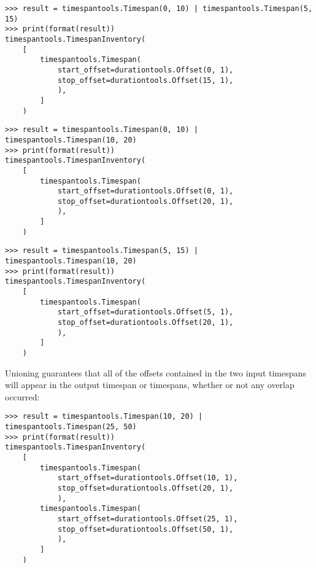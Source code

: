 \begin{abjadbookoutput}
\begin{singlespacing}
\vspace{-0.5\baselineskip}
\begin{verbatim}
>>> result = timespantools.Timespan(0, 10) | timespantools.Timespan(5, 15)
>>> print(format(result))
timespantools.TimespanInventory(
    [
        timespantools.Timespan(
            start_offset=durationtools.Offset(0, 1),
            stop_offset=durationtools.Offset(15, 1),
            ),
        ]
    )
\end{verbatim}
\begin{verbatim}
>>> result = timespantools.Timespan(0, 10) | timespantools.Timespan(10, 20)
>>> print(format(result))
timespantools.TimespanInventory(
    [
        timespantools.Timespan(
            start_offset=durationtools.Offset(0, 1),
            stop_offset=durationtools.Offset(20, 1),
            ),
        ]
    )
\end{verbatim}
\begin{verbatim}
>>> result = timespantools.Timespan(5, 15) | timespantools.Timespan(10, 20)
>>> print(format(result))
timespantools.TimespanInventory(
    [
        timespantools.Timespan(
            start_offset=durationtools.Offset(5, 1),
            stop_offset=durationtools.Offset(20, 1),
            ),
        ]
    )
\end{verbatim}
\end{singlespacing}
\end{abjadbookoutput}

\noindent Unioning guarantees that all of the offsets contained in the two
input timespans will appear in the output timespan or timespans, whether or not
any overlap occurred:

\begin{comment}
<abjad>
result = timespantools.Timespan(10, 20) | timespantools.Timespan(25, 50)
print(format(result))
</abjad>
\end{comment}

\begin{abjadbookoutput}
\begin{singlespacing}
\vspace{-0.5\baselineskip}
\begin{verbatim}
>>> result = timespantools.Timespan(10, 20) | timespantools.Timespan(25, 50)
>>> print(format(result))
timespantools.TimespanInventory(
    [
        timespantools.Timespan(
            start_offset=durationtools.Offset(10, 1),
            stop_offset=durationtools.Offset(20, 1),
            ),
        timespantools.Timespan(
            start_offset=durationtools.Offset(25, 1),
            stop_offset=durationtools.Offset(50, 1),
            ),
        ]
    )
\end{verbatim}
\end{singlespacing}
\end{abjadbookoutput}

